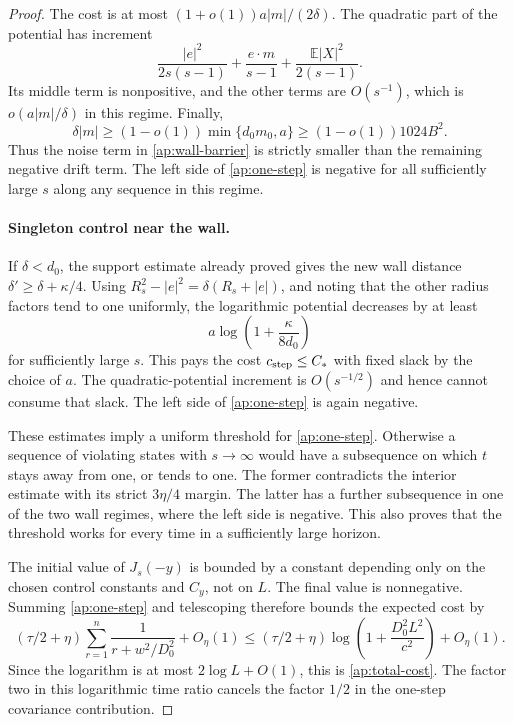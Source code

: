 \documentclass[11pt]{article}
\numberwithin{equation}{section}
\theoremstyle{definition}
\theoremstyle{remark}
\newcommand{\E}{\mathbb E}
\begin{document}
\begin{proof}
The cost is at most
\((1+o(1))a|m|/(2\delta)\).  The quadratic part of the potential
has increment
\[
 \frac{|e|^2}{2s(s-1)}+\frac{e\cdot m}{s-1}
                       +\frac{\E|X|^2}{2(s-1)}.
\]
Its middle term is nonpositive, and the other terms are \(O(s^{-1})\),
which is \(o(a|m|/\delta)\) in this regime.  Finally,
\[
 \delta|m|\geq(1-o(1))\min\{d_0m_0,a\}
                  \geq(1-o(1))1024B^2.
\]
Thus the noise term in \eqref{ap:wall-barrier} is strictly smaller
than the remaining negative drift term.  The left side of
\eqref{ap:one-step} is negative for all sufficiently large \(s\)
along any sequence in this regime.

\paragraph{Singleton control near the wall.}
If \(\delta<d_0\), the support estimate already proved gives the new
wall distance \(\delta'\geq\delta+\kappa/4\).  Using
\(R_s^2-|e|^2=\delta(R_s+|e|)\), and noting that the other radius
factors tend to one uniformly, the logarithmic potential decreases by
at least
\[
 a\log\left(1+\frac{\kappa}{8d_0}\right)
\]
for sufficiently large \(s\).  This pays the cost \(c_{\rm step}\leq C_*\)
with fixed slack by the choice of \(a\).  The quadratic-potential
increment is \(O(s^{-1/2})\) and hence cannot consume that slack.
The left side of \eqref{ap:one-step} is again negative.

These estimates imply a uniform threshold for \eqref{ap:one-step}.
Otherwise a sequence of violating states with \(s\to\infty\) would
have a subsequence on which \(t\) stays away from one, or tends to one.
The former contradicts the interior estimate with its strict
\(3\eta/4\) margin.  The latter has a further subsequence in one of
the two wall regimes, where the left side is negative.  This also proves
that the threshold works for every time in a sufficiently large horizon.

The initial value of \(J_s(-y)\) is bounded by a constant depending
only on the chosen control constants and \(C_y\), not on \(L\).
The final value is nonnegative.  Summing \eqref{ap:one-step} and
telescoping therefore bounds the expected cost by
\[
 (\tau/2+\eta)\sum_{r=1}^n
   \frac1{r+w^2/D_0^2}+O_\eta(1)
 \leq(\tau/2+\eta)
   \log\left(1+\frac{D_0^2L^2}{c^2}\right)+O_\eta(1).
\]
Since the logarithm is at most \(2\log L+O(1)\), this is
\eqref{ap:total-cost}.  The factor two in this logarithmic time ratio
cancels the factor \(1/2\) in the one-step covariance contribution.
\end{proof}
\end{document}
